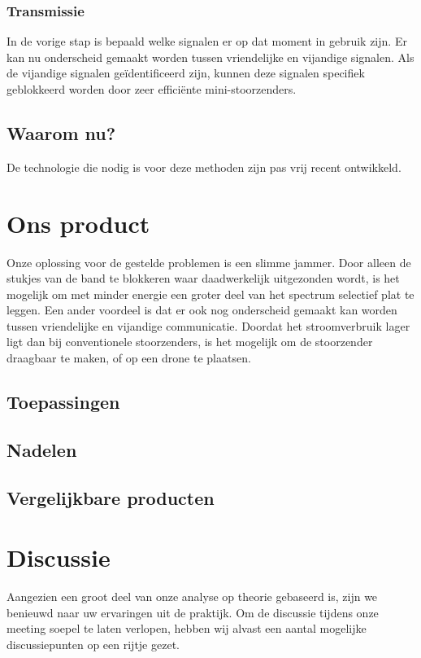 \documentclass[oneside, a4paper, openany]{memoir}
\begin{document}
\subsection{Transmissie}
In de vorige stap is bepaald welke signalen er op dat moment in gebruik zijn. Er kan nu onderscheid gemaakt worden tussen vriendelijke en vijandige signalen. Als de vijandige signalen geïdentificeerd zijn, kunnen deze signalen specifiek geblokkeerd worden door zeer efficiënte mini-stoorzenders.

\section{Waarom nu?}
De technologie die nodig is voor deze methoden zijn pas vrij recent ontwikkeld.


\chapter{Ons product}
Onze oplossing voor de gestelde problemen is een slimme jammer. Door alleen de stukjes van de band te blokkeren waar daadwerkelijk uitgezonden wordt, is het mogelijk om met minder energie een groter deel van het spectrum selectief plat te leggen. Een ander voordeel is dat er ook nog onderscheid gemaakt kan worden tussen vriendelijke en vijandige communicatie. Doordat het stroomverbruik lager ligt dan bij conventionele stoorzenders, is het mogelijk om de stoorzender draagbaar te maken, of op een drone te plaatsen.
\section{Toepassingen}

\section{Nadelen}

\section{Vergelijkbare producten}

\chapter{Discussie}
Aangezien een groot deel van onze analyse op theorie gebaseerd is, zijn we benieuwd naar uw ervaringen uit de praktijk. Om de discussie tijdens onze meeting soepel te laten verlopen, hebben wij alvast een aantal mogelijke discussiepunten op een rijtje gezet.
\end{document}
